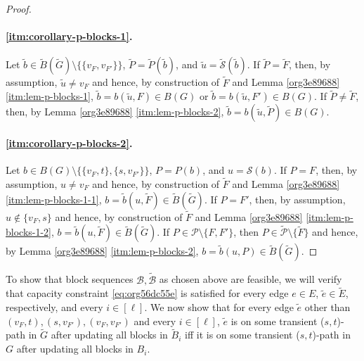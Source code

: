 \documentclass[fontsize=11pt,paper=a4]{book}
\begin{document}
\begin{proof}
~
\paragraph{\ref{itm:corollary-p-blocks-1}.}
Let \(\tilde{b}\in\tilde{B}(\tilde{G})\setminus\{\{v_F,v_{F'}\}\}\), \(\tilde{P}=\tilde{P}(\tilde{b})\), and \(\tilde{u}=\tilde{\mathcal{S}}(\tilde{b})\).
If \(\tilde{P}=\tilde{F}\), then, by assumption, \(\tilde{u}\neq v_F\) and hence, by construction of \(\tilde{F}\) and Lemma \ref{org3e89688} \ref{itm:lem-p-blocks-1}, \(\tilde{b}=b(\tilde{u},F)\in B(G)\) or \(\tilde{b}=b(\tilde{u},F')\in B(G)\).
If \(\tilde{P}\neq\tilde{F}\), then, by Lemma \ref{org3e89688} \ref{itm:lem-p-blocks-2}, \(\tilde{b}=b(\tilde{u},\tilde{P})\in B(G)\).


\paragraph{\ref{itm:corollary-p-blocks-2}.}
Let \(b\in B(G)\setminus\{\{v_F,t\},\{s,v_{F'}\}\}\), \(P=P(b)\), and \(u=\mathcal{S}(b)\).
If \(P=F\), then, by assumption, \(u\neq v_F\) and hence, by construction of \(\tilde{F}\) and Lemma \ref{org3e89688} \ref{itm:lem-p-blocks-1-1}, \(b=\tilde{b}(u,\tilde{F})\in\tilde{B}(\tilde{G})\).
If \(P=F'\), then, by assumption, \(u\notin\{v_F,s\}\) and hence, by construction of \(\tilde{F}\) and Lemma \ref{org3e89688} \ref{itm:lem-p-blocks-1-2}, \(b=\tilde{b}(u,\tilde{F})\in\tilde{B}(\tilde{G})\).
If \(P\in\mathcal{P}\setminus\{F,F'\}\), then \(P\in\tilde{\mathcal{P}}\setminus\{\tilde{F}\}\) and hence, by Lemma \ref{org3e89688} \ref{itm:lem-p-blocks-2}, \(b=\tilde{b}(u,P)\in\tilde{B}(\tilde{G})\).
\end{proof}

To show that block sequences \(\mathcal{B},\tilde{\mathcal{B}}\) as chosen above are feasible, we will verify that capacity constraint \ref{eq:org56dc55e} is satisfied for every edge \(e\in E\), \(\tilde{e}\in\tilde{E}\), respectively, and every \(i\in[\ell]\).
We now show that for every edge \(\tilde{e}\) other than \((v_F,t),(s,v_{F'}),(v_F,v_{F'})\) and every \(i\in[\ell]\), \(\tilde{e}\) is on some transient (\(s,t\))-path in \(\tilde{G}\) after updating all blocks in \(\tilde{B}_i\) iff it is on some transient (\(s,t\))-path in \(G\) after updating all blocks in \(B_i\).
\end{document}
